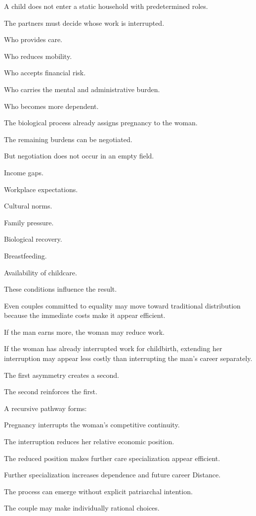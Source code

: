 A child does not enter a static household with predetermined roles.

The partners must decide whose work is interrupted.

Who provides care.

Who reduces mobility.

Who accepts financial risk.

Who carries the mental and administrative burden.

Who becomes more dependent.

The biological process already assigns pregnancy to the woman.

The remaining burdens can be negotiated.

But negotiation does not occur in an empty field.

Income gaps.

Workplace expectations.

Cultural norms.

Family pressure.

Biological recovery.

Breastfeeding.

Availability of childcare.

These conditions influence the result.

Even couples committed to equality may move toward traditional distribution because the immediate costs make it appear efficient.

If the man earns more, the woman may reduce work.

If the woman has already interrupted work for childbirth, extending her interruption may appear less costly than interrupting the man’s career separately.

The first asymmetry creates a second.

The second reinforces the first.

A recursive pathway forms:

Pregnancy interrupts the woman’s competitive continuity.

The interruption reduces her relative economic position.

The reduced position makes further care specialization appear efficient.

Further specialization increases dependence and future career Distance.

The process can emerge without explicit patriarchal intention.

The couple may make individually rational choices.

